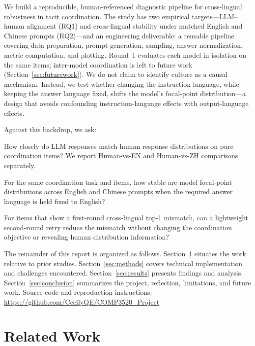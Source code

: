 \documentclass[11pt]{article}
\newcommand{\githuburl}{\url{https://github.com/CecilyQE/COMP3520_Project}}
\begin{document}
We build a reproducible, human-referenced diagnostic pipeline for cross-lingual robustness in tacit coordination. The study has two empirical targets---LLM--human alignment (RQ1) and cross-lingual stability under matched English and Chinese prompts (RQ2)---and an engineering deliverable: a reusable pipeline covering data preparation, prompt generation, sampling, answer normalization, metric computation, and plotting. Round~1 evaluates each model in isolation on the same items; inter-model coordination is left to future work (Section~\ref{sec:futurework}). We do not claim to identify culture as a causal mechanism. Instead, we test whether changing the instruction language, while keeping the answer language fixed, shifts the model's focal-point distribution---a design that avoids confounding instruction-language effects with output-language effects.

Against this backdrop, we ask:
\begin{description}[leftmargin=0.2in,style=nextline]
  \item[RQ1 (Human alignment).]
  How closely do LLM responses match human response distributions on pure coordination items? We report Human-vs-EN and Human-vs-ZH comparisons separately.

  \item[RQ2 (Cross-lingual stability).]
  For the same coordination task and items, how stable are model focal-point distributions across English and Chinese prompts when the required answer language is held fixed to English?

  \item[RQ3 (Exploratory re-coordination).]
  For items that show a first-round cross-lingual top-1 mismatch, can a lightweight second-round retry reduce the mismatch without changing the coordination objective or revealing human distribution information?
\end{description}

The remainder of this report is organized as follows. Section~\ref{sec:related} situates the work relative to prior studies. Section~\ref{sec:methods} covers technical implementation and challenges encountered. Section~\ref{sec:results} presents findings and analysis. Section~\ref{sec:conclusion} summarizes the project, reflection, limitations, and future work. Source code and reproduction instructions: \githuburl

\section{Related Work}
\label{sec:related}
\end{document}
